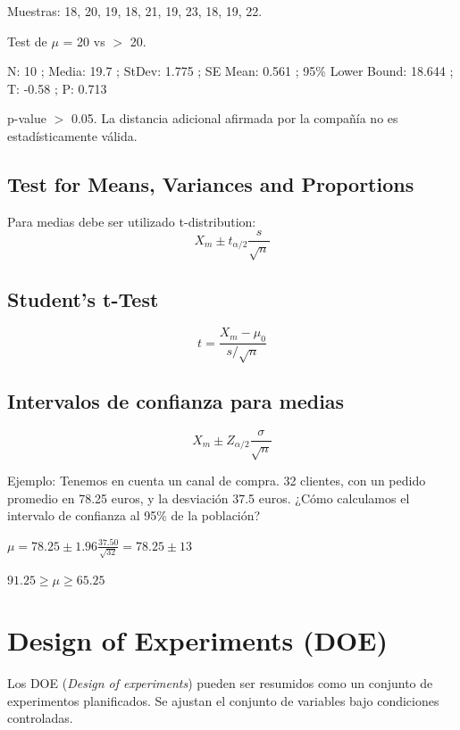 \documentclass[]{article}
\begin{document}
Muestras: 18, 20, 19, 18, 21, 19, 23, 18, 19, 22. 
 
Test de $\mu$ = 20 vs $>$ 20. 

N: 10 ; Media: 19.7 ; StDev: 1.775 ; SE Mean: 0.561 ; 95\% Lower Bound: 18.644 ; T: -0.58 ; P: 0.713 

p-value $>$ 0.05. La distancia adicional afirmada por la compañía no es estadísticamente válida.

\subsection{Test for Means, Variances and Proportions}

Para medias debe ser utilizado t-distribution:
\begin{equation}
X_m \pm t_{\alpha/2}\frac{s}{\sqrt{n}}
\end{equation}

\subsection{Student's t-Test}
\begin{equation}
t = \frac{X_m-\mu_0}{s/\sqrt{n}}
\end{equation}

\subsection{Intervalos de confianza para medias}
\begin{equation}
X_m \pm Z_{\alpha/2} \frac{\sigma}{\sqrt{n}}
\end{equation}

Ejemplo: Tenemos en cuenta un canal de compra. 32 clientes, con un pedido promedio en 78.25 euros, y la desviación 37.5 euros. ¿Cómo calculamos el intervalo de confianza al 95\% de la población? \newline
\begin{center}$\mu = 78.25 \pm 1.96\frac{37.50}{\sqrt{32}} = 78.25 \pm 13$ \end{center} 
\begin{center}$91.25 \geq \mu \geq 65.25 $ \end{center}

\section{Design of Experiments (DOE)}

Los DOE (\textit{Design of experiments}) pueden ser resumidos como un conjunto de experimentos planificados. Se ajustan el conjunto de variables bajo condiciones controladas.
\end{document}
